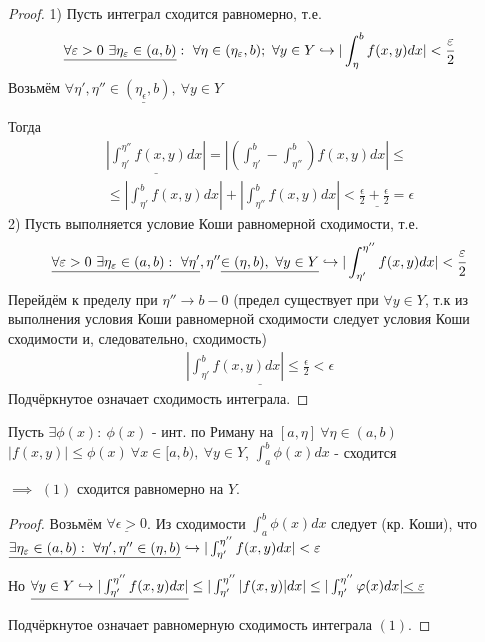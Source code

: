 \documentclass{article}
\begin{document}
\begin{proof}
  \phantom{.}

  1) Пусть интеграл сходится равномерно, т.е.
  \begin{gather*}
    \underline{\forall \epsilon > 0 \ \exists \eta_{\epsilon}\in(a,b)}: \ \forall \eta \in (\eta_\epsilon,b); \ \forall y \in Y 
    \true |\int_{\eta}^{b}f(x,y)dx|<\frac{\epsilon}{2}
  \end{gather*}
  Возьмём  $\underline{\forall \eta',\eta'' \in (\eta_\epsilon,b), \ \forall y \in Y}$

  Тогда
  \begin{gather*}
    \underline{|\int_{\eta'}^{\eta''}f(x,y)dx|}=|(\int_{\eta'}^{b}-\int_{\eta''}^{b})f(x,y)dx|  \le \\
    \le |\int_{\eta'}^{b}f(x,y)dx| + |\int_{\eta''}^{b}f(x,y)dx|
    \underline{< \frac{\epsilon}{2}+\frac{\epsilon}{2}=\epsilon}
  \end{gather*}
  2) Пусть выполняется условие Коши равномерной сходимости, т.е.
  \begin{gather*}
    \underline{\forall \varepsilon>0 \ \exists \eta_\varepsilon \in (a,b): \ \forall \eta'},\eta'' \underline{\in (\eta,b), \ \forall y \in Y}
    \hookrightarrow |\int_{\eta'}^{\eta''}f(x,y)dx| < \frac{\varepsilon}{2}
  \end{gather*}
  Перейдём к пределу при $\eta''\to b-0$ (предел существует при $\forall y \in Y$, т.к 
  из выполнения условия Коши равномерной сходимости следует условия Коши сходимости 
  и, следовательно, сходимость)
  \begin{gather*}
    \underline{|\int_{\eta'}^{b}f(x,y)dx|\le \frac{\epsilon}{2} < \epsilon}
  \end{gather*}
  Подчёркнутое означает сходимость интеграла.
\end{proof}
\begin{theorem}
  Пусть $\exists \phi(x): \ \phi(x)$ - инт. по Риману на $[a,\eta] \ \forall \eta \in (a,b)$
  $|f(x,y)| \le \phi(x) \ \forall x \in [a,b), \ \forall y \in Y$,
  $\int_{a}^{b}\phi(x)dx$ - сходится

  $\implies$ $(1)$ сходится равномерно на $Y$.
\end{theorem}
\begin{proof}
  Возьмём $\underline{\forall \epsilon >0}$. Из сходимости $\int_{a}^{b}\phi(x)dx$ следует (кр. Коши),
  что $\underline{\exists \eta_\varepsilon \in (a,b): \ \forall \eta',\eta'' \in (\eta,b)} 
    \hookrightarrow |\int_{\eta'}^{\eta''}f(x,y)dx| < \varepsilon$
  
    Но $\underline{\forall y \in Y \hookrightarrow |\int_{\eta'}^{\eta''}f(x,y)dx|} \le |\int_{\eta'}^{\eta''}|f(x,y)|dx|
    \le |\int_{\eta'}^{\eta''}\varphi(x)dx|\underline{<\varepsilon}$

    Подчёркнутое означает равномерную сходимость интеграла $(1)$.
\end{proof}
\end{document}

